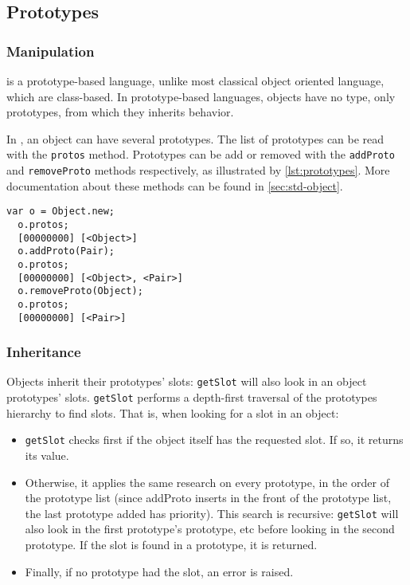 \documentclass[openright,twoside,12pt]{report}
\begin{document}
\subsection{Prototypes}

\subsubsection{Manipulation}

\us is a prototype-based language, unlike most classical object
oriented language, which are class-based. In prototype-based
languages, objects have no type, only prototypes, from which they
inherits behavior.

In \us, an object can have several prototypes. The list of prototypes
can be read with the \lstinline|protos| method. Prototypes can be add
or removed with the \lstinline|addProto| and \lstinline|removeProto|
methods respectively, as illustrated by \autoref{lst:prototypes}. More
documentation about these methods can be found in \autoref{sec:std-object}.

\begin{lstlisting}[caption=Manipulating prototypes, label=lst:prototypes,
  float=\floatpos]
  var o = Object.new;
  o.protos;
  [00000000] [<Object>]
  o.addProto(Pair);
  o.protos;
  [00000000] [<Object>, <Pair>]
  o.removeProto(Object);
  o.protos;
  [00000000] [<Pair>]
\end{lstlisting}

\subsubsection{Inheritance}

Objects inherit their prototypes' slots: \lstinline|getSlot| will also
look in an object prototypes' slots. \lstinline|getSlot| performs a
depth-first traversal of the prototypes hierarchy to find slots. That
is, when looking for a slot in an object:

\begin{itemize}
\item \lstinline|getSlot| checks first if the object itself has the
  requested slot. If so, it returns its value.
\item Otherwise, it applies the same research on every prototype, in
  the order of the prototype list (since addProto inserts in the front
  of the prototype list, the last prototype added has priority). This
  search is recursive: \lstinline|getSlot| will also look in the first
  prototype's prototype, etc before looking in the second
  prototype. If the slot is found in a prototype, it is returned.
\item Finally, if no prototype had the slot, an error is raised.
\end{itemize}
\end{document}
